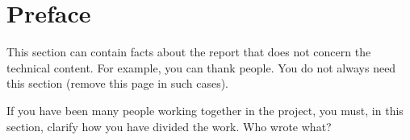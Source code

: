 \thispagestyle{plain}

\section*{Preface}
This section can contain facts about the report that does not
concern the technical content. For example, you can thank people.
You do not always need this section (remove this page in such
cases).

If you have been many people working together in the project, you
must, in this section, clarify how you have divided the work. Who
wrote what?
